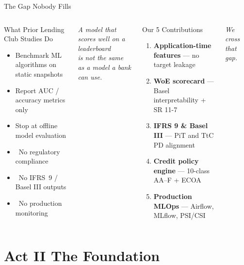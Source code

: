 \documentclass[aspectratio=169,11pt]{beamer}
\newcommand{\no}{\textcolor{alertred}{\texttimes}}
\newcommand{\B}[1]{\textbf{#1}}
\begin{document}
\begin{frame}{The Gap Nobody Fills}
  \begin{columns}[T]
      \begin{alertblock}{What Prior Lending Club Studies Do}
        \begin{itemize}\small
          \item Benchmark ML algorithms on static snapshots
          \item Report AUC / accuracy metrics only
          \item Stop at offline model evaluation
          \item \no\ No regulatory compliance
          \item \no\ No IFRS~9 / Basel III outputs
          \item \no\ No production monitoring
        \end{itemize}
      \end{alertblock}
      \vspace{4pt}
      \centering\small\textit{A model that scores well on a leaderboard\\is not the same as a model a bank can use.}

      \begin{exampleblock}{Our 5 Contributions}
        \begin{enumerate}\small
          \item \B{Application-time features} --- no target leakage
          \item \B{WoE scorecard} --- Basel interpretability + SR 11-7
          \item \B{IFRS 9 \& Basel III} --- PiT and TtC PD alignment
          \item \B{Credit policy engine} --- 10-class AA--F + ECOA
          \item \B{Production MLOps} --- Airflow, MLflow, PSI/CSI
        \end{enumerate}
      \end{exampleblock}
      \vspace{4pt}
      \centering\small\textit{We cross that gap.}
  \end{columns}
\end{frame}

\section{Act II \textemdash{} The Foundation}
\end{document}
